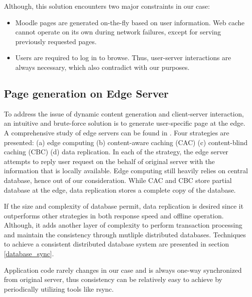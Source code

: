 Although, this solution encounters two major constraints in our case:
\begin{itemize}
\item Moodle pages are generated on-the-fly based on user information. Web cache cannot operate on its own during network failures, except for serving previously requested pages.
\item Users are required to log in to browse. Thus, user-server interactions are always necessary, which also contradict with our purposes.
\end{itemize}


\subsection{Page generation on Edge Server}
To address the issue of dynamic content generation and client-server interaction, an intuitive and brute-force solution is to generate user-specific page at the edge. A comprehensive study of edge servers can be found in \cite{pathan2008content}. Four strategies are presented: (a) edge computing (b) content-aware caching (CAC) (c) content-blind caching (CBC) (d) data replication.
In each of the strategy, the edge server attempts to reply user request on the behalf of original server with the information that is locally available. Edge computing still heavily relies on central database, hence out of our consideration. While CAC and CBC store partial database at the edge, data replication stores a complete copy of the database.

If the size and complexity of database permit, data replication is desired since it outperforms other strategies in both response speed and offline operation. Although, it adds another layer of complexity to perform transaction processing and maintain the consistency through mutliple distributed databases. Techniques to achieve a consistent distributed database system are presented in section \ref{database_sync}.

Application code rarely changes in our case and is always one-way synchronized from original server, thus consistency can be relatively easy to achieve by periodically utilizing tools like rsync\cite{tridgell1999efficient}.

